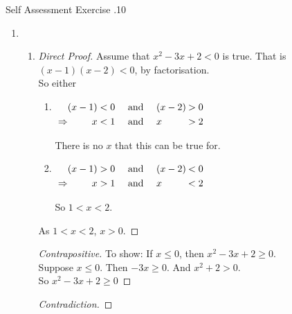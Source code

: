\documentclass[../notes.tex]{subfiles}
\begin{document}
				\begin{exercise}{Self Assessment Exercise \thechapter.10}
					\begin{enumerate}
						\item {}
							\begin{enumerate}[label=(\alph*)]
								\item {}
									\begin{proof}[Direct Proof]
										Assume that $x^{2} - 3x + 2 < 0$ is true. That is $(x - 1)(x - 2) < 0$, by factorisation.\\
										So either
										\begin{enumerate}[label=(\roman*)]
											\item 
												$ \begin{alignedat}[t]{3}
													& & (x - 1) &< 0 \quad \text{ and } \quad (x - 2) \: &> 0\\
													& \Rightarrow & x &< 1 \quad \text{ and } \quad x &> 2 
												\end{alignedat} $
												\begin{indentparagraph}
													There is no $x$ that this can be true for.
												\end{indentparagraph}
											\item 
												$ \begin{alignedat}[t]{3}
													& & (x - 1) &> 0 \quad \text{ and } \quad (x - 2) \: &< 0\\
													& \Rightarrow & x &> 1 \quad \text{ and } \quad x &< 2 
												\end{alignedat} $
												\begin{indentparagraph}
													So $1 < x < 2$.
												\end{indentparagraph}
										\end{enumerate}
										As $1 < x < 2$, $x > 0$.
									\end{proof}
									\begin{proof}[Contrapositive]
										To show: If $x \leq 0$, then $x^{2} - 3x + 2 \geq 0$.\\
										Suppose $x \leq 0$. Then $-3x \geq 0$. And $x^{2} + 2 > 0$.\\
										So $x^{2} - 3x + 2 \geq 0$
									\end{proof}
									\begin{proof}[Contradiction]

\end{proof}
\end{enumerate}
\end{enumerate}
\end{exercise}
\end{document}
